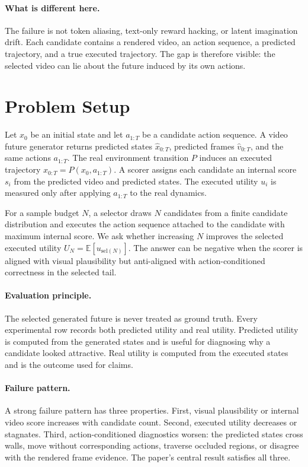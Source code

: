 \documentclass{article}
\newcommand{\score}{s}
\newcommand{\utility}{u}
\newcommand{\selected}{\mathrm{sel}}
\begin{document}
\paragraph{What is different here.}
The failure is not token aliasing, text-only reward hacking, or latent imagination drift. Each candidate contains a rendered video, an action sequence, a predicted trajectory, and a true executed trajectory. The gap is therefore visible: the selected video can lie about the future induced by its own actions.

\section{Problem Setup}

Let \(x_0\) be an initial state and let \(a_{1:T}\) be a candidate action sequence. A video future generator returns predicted states \(\hat{x}_{0:T}\), predicted frames \(\hat{v}_{0:T}\), and the same actions \(a_{1:T}\). The real environment transition \(P\) induces an executed trajectory \(x_{0:T}=P(x_0,a_{1:T})\). A scorer assigns each candidate an internal score \(\score_i\) from the predicted video and predicted states. The executed utility \(\utility_i\) is measured only after applying \(a_{1:T}\) to the real dynamics.

For a sample budget \(N\), a selector draws \(N\) candidates from a finite candidate distribution and executes the action sequence attached to the candidate with maximum internal score. We ask whether increasing \(N\) improves the selected executed utility \(U_N = \mathbb{E}[\utility_{\selected(N)}]\). The answer can be negative when the scorer is aligned with visual plausibility but anti-aligned with action-conditioned correctness in the selected tail.

\paragraph{Evaluation principle.}
The selected generated future is never treated as ground truth. Every experimental row records both predicted utility and real utility. Predicted utility is computed from the generated states and is useful for diagnosing why a candidate looked attractive. Real utility is computed from the executed states and is the outcome used for claims.

\paragraph{Failure pattern.}
A strong failure pattern has three properties. First, visual plausibility or internal video score increases with candidate count. Second, executed utility decreases or stagnates. Third, action-conditioned diagnostics worsen: the predicted states cross walls, move without corresponding actions, traverse occluded regions, or disagree with the rendered frame evidence. The paper's central result satisfies all three.
\end{document}
